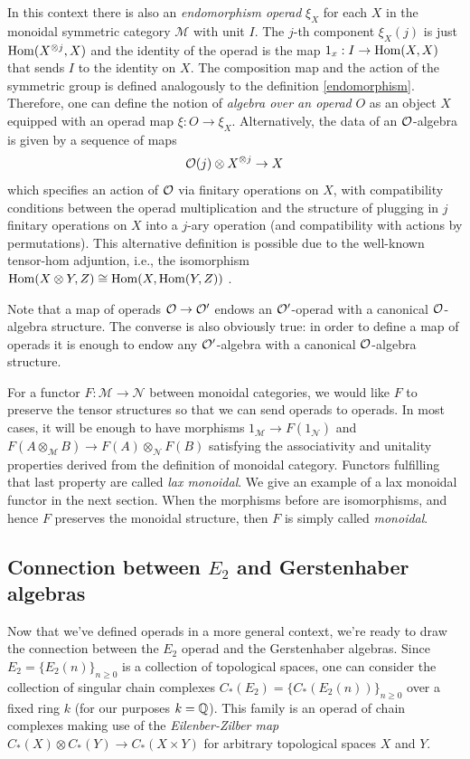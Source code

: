\documentclass[TFM.tex]{subfiles}
\begin{document}
In this context there is also an \emph{endomorphism operad} $\xi_X$ for each $X$ in the monoidal symmetric category $\mathscr{M}$ with unit $I$. The $j$-th component $\xi_X(j)$ is just $\operatorname{Hom}(X^{\otimes j},X)$ and the identity of the operad is the map $1_x:I\to \operatorname{Hom}(X,X)$ that sends $I$ to the identity on $X$. The composition map and the action of the symmetric group is defined analogously to the definition \ref{endomorphism}. Therefore, one can define the notion of \emph{algebra over an operad} $O$ as an object $X$ equipped with an operad map $\xi:O\to\xi_X$. Alternatively, the data of an ${\mathcal O}$-algebra is given by a sequence of maps
\[
{\mathcal O}(j) \otimes X^{\otimes j} \to X
\]
which specifies an action of ${\mathcal O}$ via finitary operations on $X$, with compatibility conditions between the operad multiplication and the structure of plugging in $j$ finitary operations on $X$ into a $j$-ary operation (and compatibility with actions by permutations). This alternative definition is possible due to the well-known tensor-hom adjuntion, i.e., the isomorphism $\operatorname{Hom}(X\otimes Y,Z)\cong \operatorname{Hom}(X,\operatorname{Hom}(Y,Z))$ \cite{tensor-hom}.

Note that a map of operads ${\mathcal O}\to {\mathcal O}'$ endows an ${\mathcal O}'$-operad with a canonical ${\mathcal O}$-algebra structure. The converse is also obviously true: in order to define a map of operads it is enough to endow any ${\mathcal O}'$-algebra with a canonical ${\mathcal O}$-algebra structure. 

For a functor $F:\mathscr{M}\to\mathscr{N}$ between monoidal categories, we would like $F$ to preserve the tensor structures so that we can send operads to operads. In most cases, it will be enough to have  morphisms $1_{\mathscr{M}}\to F(1_\mathscr{N})$ and $F(A\otimes_{\mathscr{M}}B)\to F(A)\otimes_{\mathscr{N}} F(B)$ satisfying the associativity and unitality properties derived from the definition of monoidal category. Functors fulfilling that last property are called \emph{lax monoidal}. We give an example of a lax monoidal functor in the next section. When the morphisms before are isomorphisms, and hence $F$ preserves the monoidal structure, then $F$ is simply called \emph{monoidal}.

\subsection{Connection between $E_2$ and Gerstenhaber algebras}\label{zilber}

Now that we've defined operads in a more general context, we're ready to draw the connection between the $E_2$ operad and the Gerstenhaber algebras. Since $E_2=\{E_2(n)\}_{n\geq 0}$ is a collection of topological spaces, one can consider the collection of singular chain complexes $C_*(E_2)=\{C_*(E_2(n))\}_{n\geq 0}$ over a fixed ring $k$ (for our purposes $k=\mathbb{Q}$). This family is an operad of chain complexes making use of the \emph{Eilenber-Zilber map} \cite{EZ} $C_*(X)\otimes C_*(Y)\to C_*(X\times Y)$ for arbitrary topological spaces $X$ and $Y$. 
\end{document}

